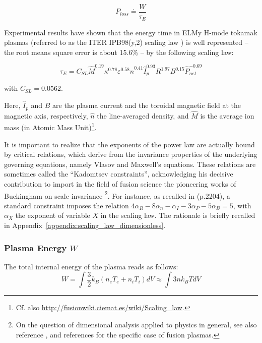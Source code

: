 \begin{equation}
	P_{loss} \doteq \frac{ W }{ \tau_E } 
	\label{eq:definition_confinement_time}
\end{equation}

Experimental results have shown that the energy time in ELMy H-mode tokamak plasmas (referred to as the ITER IPB98(y,2) scaling law \cite[eq.(20)]{ITERphysics_chap2}) is well represented -- the root means square error is about 15.6\% -- by the following scaling law:

\begin{equation}
	\tau_E = C_{SL} \hat M^{0.19} \kappa^{0.78} \varepsilon^{0.58} 
	\hat n^{0.41} \hat I_p^{0.93} R^{1.97} B^{0.15}  \hat P_{net}^{-0.69}
	\label{eq:scaling_law_IPB98(y,2)}
\end{equation}

\noindent
with $C_{SL} = 0.0562$.


Here, $\hat I_p$ and $B$ are the plasma current and the toroidal magnetic field at the magnetic axis, respectively, $\hat n$ the line-averaged density, and $\hat M$ is the average ion mass (in Atomic Mass Unit)\footnote{Cf. also \url{http://fusionwiki.ciemat.es/wiki/Scaling_law}.}. 


It is important to realize that the exponents of the power law are actually bound by critical relations, which derive from the invariance properties of the underlying governing equations, namely Vlasov and Maxwell's equations. These relations are sometimes called the ``Kadomtsev constraints'', acknowledging his decisive contribution \cite{Kadomtsev1975} to import in the field of fusion science the pioneering works of Buckingham on scale invariance \cite{Buckingham1914}\footnote{On the question of dimensional analysis applied to physics in general, see also reference \cite{Misic2010}, and references \cite{Connor1977, Luce2008} for the specific case of fusion plasmas.}. For instance, as recalled in \cite{ITERphysics_chap2} (p.2204), a standard constraint imposes the relation 
$4\alpha_R - 8\alpha_n - \alpha_I - 3\alpha_P - 5\alpha_B = 5$, with $\alpha_X$ the exponent of variable $X$ in the scaling law. The rationale is briefly recalled in Appendix~\ref{appendix:scaling_law_dimensionless}.



\subsubsection{Plasma Energy $W$}
The total internal energy of the plasma reads as follows:
\begin{equation*}
W  = \int \frac{3}{2} k_B \left( n_e T_e + n_i T_i \right ) dV 
\approx \int 3 n k_BT dV
\end{equation*}


